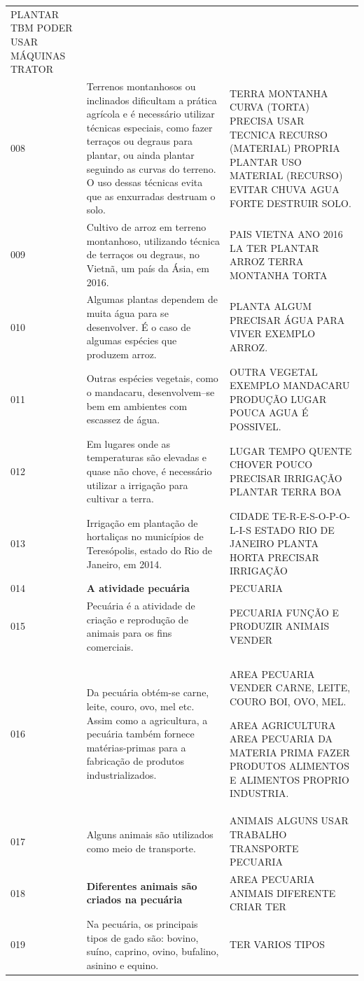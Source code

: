 \documentclass[portuguese]{textolivre}
\begin{document}
\begin{footnotesize}
\begin{longtable}{
l 
    >{\raggedright\arraybackslash}p{}
    >{\raggedright\arraybackslash}p{}
    }
PLANTAR TBM PODER USAR MÁQUINAS TRATOR \\
008 & Terrenos montanhosos ou inclinados dificultam a prática agrícola e é necessário utilizar técnicas especiais, como fazer terraços ou degraus para plantar, ou ainda plantar seguindo as curvas do terreno. O uso dessas técnicas evita que as enxurradas destruam o solo. & TERRA MONTANHA CURVA (TORTA) PRECISA  USAR TECNICA RECURSO (MATERIAL) PROPRIA PLANTAR  USO MATERIAL (RECURSO) EVITAR CHUVA AGUA FORTE DESTRUIR SOLO. \\
009 & Cultivo de arroz em terreno montanhoso, utilizando técnica de terraços ou degraus, no Vietnã, um país da Ásia, em 2016. & PAIS VIETNA ANO 2016 LA TER PLANTAR ARROZ TERRA MONTANHA TORTA \\
010 & Algumas plantas dependem de muita água para se desenvolver. É o caso de algumas espécies que produzem arroz. & PLANTA ALGUM PRECISAR ÁGUA PARA VIVER EXEMPLO ARROZ. \\
011 & Outras espécies vegetais, como o mandacaru, desenvolvem–se bem em ambientes com escassez de água. & OUTRA VEGETAL EXEMPLO MANDACARU PRODUÇÃO LUGAR POUCA AGUA É POSSIVEL. \\
012 & Em lugares onde as temperaturas são elevadas e quase não chove, é necessário utilizar a irrigação para cultivar a terra. & LUGAR TEMPO QUENTE CHOVER POUCO PRECISAR IRRIGAÇÃO PLANTAR TERRA BOA \\
013 & Irrigação em plantação de hortaliças no municípios de Teresópolis, estado do Rio de Janeiro, em 2014. & CIDADE TE-R-E-S-O-P-O-L-I-S ESTADO RIO DE JANEIRO PLANTA HORTA PRECISAR IRRIGAÇÃO \\
014 & \textbf{A atividade pecuária} & PECUARIA \\
015 & Pecuária é a atividade de criação e reprodução de animais para os fins comerciais. & 
PECUARIA FUNÇÃO E PRODUZIR ANIMAIS VENDER \\
016 & Da pecuária obtém-se carne, leite, couro, ovo, mel etc. Assim como a agricultura, a pecuária também fornece matérias-primas para a fabricação de produtos industrializados. & 
AREA PECUARIA VENDER CARNE, LEITE, COURO BOI, OVO, MEL. 

AREA AGRICULTURA AREA PECUARIA DA MATERIA PRIMA FAZER PRODUTOS ALIMENTOS E ALIMENTOS PROPRIO INDUSTRIA. \\
017 & Alguns animais são utilizados como meio de transporte. & ANIMAIS ALGUNS USAR TRABALHO TRANSPORTE PECUARIA \\
018 & \textbf{Diferentes animais são criados na pecuária} & AREA PECUARIA ANIMAIS DIFERENTE CRIAR TER \\
019 & Na pecuária, os principais tipos de gado são: bovino, suíno, caprino, ovino, bufalino, asinino e equino. & TER VARIOS TIPOS


\end{longtable}
\end{footnotesize}
\end{document}
